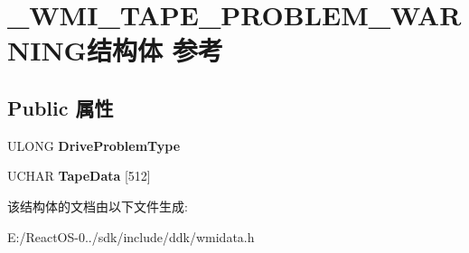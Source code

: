 \hypertarget{struct___w_m_i___t_a_p_e___p_r_o_b_l_e_m___w_a_r_n_i_n_g}{}\section{\+\_\+\+W\+M\+I\+\_\+\+T\+A\+P\+E\+\_\+\+P\+R\+O\+B\+L\+E\+M\+\_\+\+W\+A\+R\+N\+I\+N\+G结构体 参考}
\label{struct___w_m_i___t_a_p_e___p_r_o_b_l_e_m___w_a_r_n_i_n_g}
\subsection*{Public 属性}
\begin{DoxyCompactItemize}
\item 
\mbox{\label{struct___w_m_i___t_a_p_e___p_r_o_b_l_e_m___w_a_r_n_i_n_g_ad4d2453ebfd75ba53c5e3f8f60251527}} 
U\+L\+O\+NG {\bfseries Drive\+Problem\+Type}
\item 
\mbox{\label{struct___w_m_i___t_a_p_e___p_r_o_b_l_e_m___w_a_r_n_i_n_g_aee19a3b68b7fc30009f36333ecfff4b5}} 
U\+C\+H\+AR {\bfseries Tape\+Data} \mbox{[}512\mbox{]}
\end{DoxyCompactItemize}


该结构体的文档由以下文件生成\+:\begin{DoxyCompactItemize}
\item 
E\+:/\+React\+O\+S-\/0../sdk/include/ddk/wmidata.\+h\end{DoxyCompactItemize}
